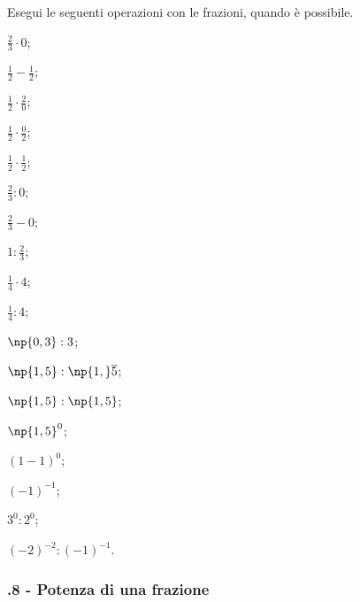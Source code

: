 \begin{esercizio}
 \label{ese:3.61}
Esegui le seguenti operazioni con le frazioni, quando è possibile.
\begin{multicols}{3}
\begin{enumeratea}
\spazielenx
\item $\displaystyle{\frac{2}{3}\cdot0}$;
\item $\displaystyle{\frac{1}{2}-\frac{1}{2}}$;
\item $\displaystyle{\frac{1}{2}\cdot\frac{2}{0}}$;
\item $\displaystyle{\frac{1}{2}}\cdot\frac{0}{2}$;
\item $\displaystyle{\frac{1}{2}\cdot\frac{1}{2}}$;
\item $\displaystyle{\frac{2}{3}:0}$;
\item $\displaystyle{\frac{2}{3}-0}$;
\item $\displaystyle{1:\frac{2}{3}}$;
\item $\displaystyle{\frac{1}{4}\cdot4}$;
\item $\displaystyle{\frac{1}{4}:4}$;
\item $\np{0,3}:3$;
\item $\displaystyle{\np{1,5}:\np{1,}\overline{5}}$;
\item $\np{1,5}:\np{1,5}$;
\item $\np{1,5}^0$;
\item $(1-1)^0$;
\item $(-1)^{-1}$;
\item $3^0:2^0$;
\item $(-2)^{-2}:(-1)^{-1}$.
\end{enumeratea}
\end{multicols}
\end{esercizio}

\subsubsection*{\thechapter.8 - Potenza di una frazione}


